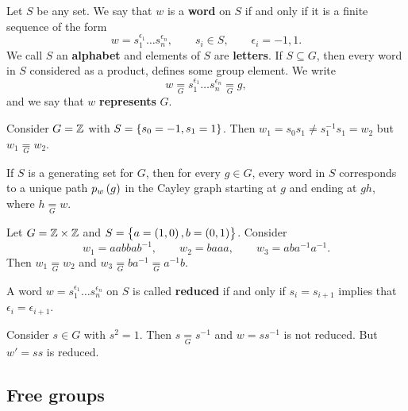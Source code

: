 \begin{definition}
Let $ S $ be any set. We say that $ w $ is a \textbf{word} on $ S $ if and only if it is a finite sequence of the form
$$ w = s_1^{\epsilon_1} \dots s_n^{\epsilon_n}, \qquad s_i \in S, \qquad \epsilon_i = -1, 1. $$
We call $ S $ an \textbf{alphabet} and elements of $ S $ are \textbf{letters}. If $ S \subseteq G $, then every word in $ S $ considered as a product, defines some group element. We write
$$ w \underset{G}{=} s_1^{\epsilon_1} \dots s_n^{\epsilon_n} \underset{G}{=} g, $$
and we say that $ w $ \textbf{represents} $ G $.
\end{definition}

\begin{example}
Consider $ G = \mathbb{Z} $ with $ S = \cbr{s_0 = -1, s_1 = 1} $. Then $ w_1 = s_0s_1 \ne s_1^{-1}s_1 = w_2 $ but $ w_1 \underset{G}{=} w_2 $.
\end{example}

\pagebreak

\begin{remark}
If $ S $ is a generating set for $ G $, then for every $ g \in G $, every word in $ S $ corresponds to a unique path $ p_w\br{g} $ in the Cayley graph starting at $ g $ and ending at $ gh $, where $ h \underset{G}{=} w $.
\end{remark}

\begin{example}
Let $ G = \mathbb{Z} \times \mathbb{Z} $ and $ S = \cbr{a = \br{1, 0}, b = \br{0, 1}} $. Consider
$$ w_1 = aabbab^{-1}, \qquad w_2 = baaa, \qquad w_3 = aba^{-1}a^{-1}. $$
Then $ w_1 \underset{G}{=} w_2 $ and $ w_3 \underset{G}{=} ba^{-1} \underset{G}{=} a^{-1}b $.
\end{example}

\begin{definition}
A word $ w = s_1^{\epsilon_1} \dots s_n^{\epsilon_n} $ on $ S $ is called \textbf{reduced} if and only if $ s_i = s_{i + 1} $ implies that $ \epsilon_i = \epsilon_{i + 1} $.
\end{definition}

Consider $ s \in G $ with $ s^2 = 1 $. Then $ s \underset{G}{=} s^{-1} $ and $ w = ss^{-1} $ is not reduced. But $ w' = ss $ is reduced.

\subsection{Free groups}


